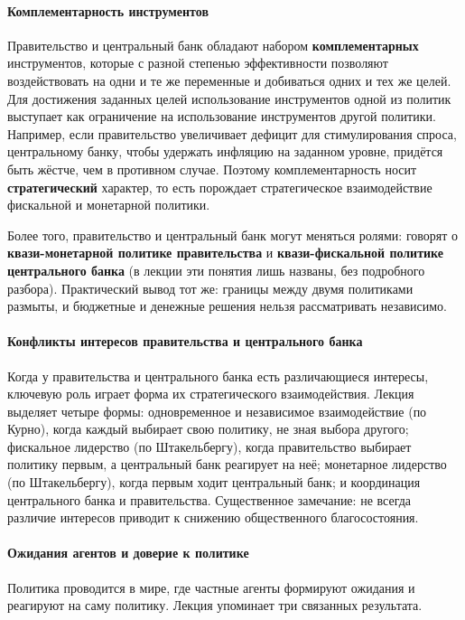 \documentclass[11pt,a4paper]{article}
\begin{document}
\paragraph{Комплементарность инструментов}

Правительство и центральный банк обладают набором \textbf{комплементарных} инструментов, которые с разной степенью эффективности позволяют воздействовать на одни и те же переменные и добиваться одних и тех же целей. Для достижения заданных целей использование инструментов одной из политик выступает как ограничение на использование инструментов другой политики. Например, если правительство увеличивает дефицит для стимулирования спроса, центральному банку, чтобы удержать инфляцию на заданном уровне, придётся быть жёстче, чем в противном случае. Поэтому комплементарность носит \textbf{стратегический} характер, то есть порождает стратегическое взаимодействие фискальной и монетарной политики.

Более того, правительство и центральный банк могут меняться ролями: говорят о \textbf{квази-монетарной политике правительства} и \textbf{квази-фискальной политике центрального банка} (в лекции эти понятия лишь названы, без подробного разбора). Практический вывод тот же: границы между двумя политиками размыты, и бюджетные и денежные решения нельзя рассматривать независимо.

\paragraph{Конфликты интересов правительства и центрального банка}

Когда у правительства и центрального банка есть различающиеся интересы, ключевую роль играет форма их стратегического взаимодействия. Лекция выделяет четыре формы: одновременное и независимое взаимодействие (по Курно), когда каждый выбирает свою политику, не зная выбора другого; фискальное лидерство (по Штакельбергу), когда правительство выбирает политику первым, а центральный банк реагирует на неё; монетарное лидерство (по Штакельбергу), когда первым ходит центральный банк; и координация центрального банка и правительства. Существенное замечание: не всегда различие интересов приводит к снижению общественного благосостояния.

\paragraph{Ожидания агентов и доверие к политике}

Политика проводится в мире, где частные агенты формируют ожидания и реагируют на саму политику. Лекция упоминает три связанных результата.
\end{document}
